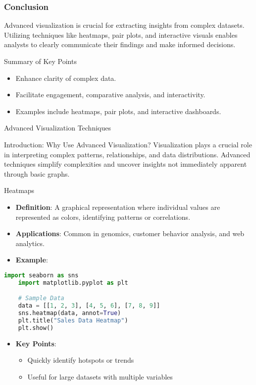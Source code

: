 \documentclass[aspectratio=169]{beamer}
\begin{document}
\begin{frame}[fragile]
    \frametitle{Conclusion}
    Advanced visualization is crucial for extracting insights from complex datasets. Utilizing techniques like heatmaps, pair plots, and interactive visuals enables analysts to clearly communicate their findings and make informed decisions. 

    \begin{block}{Summary of Key Points}
        \begin{itemize}
            \item Enhance clarity of complex data.
            \item Facilitate engagement, comparative analysis, and interactivity.
            \item Examples include heatmaps, pair plots, and interactive dashboards.
        \end{itemize}
    \end{block}
\end{frame}

\begin{frame}{Advanced Visualization Techniques}
    \begin{block}{Introduction: Why Use Advanced Visualization?}
        Visualization plays a crucial role in interpreting complex patterns, relationships, and data distributions. Advanced techniques simplify complexities and uncover insights not immediately apparent through basic graphs.
    \end{block}
\end{frame}

\begin{frame}[fragile]{Heatmaps}
    \begin{itemize}
        \item \textbf{Definition}: A graphical representation where individual values are represented as colors, identifying patterns or correlations.
        \item \textbf{Applications}: Common in genomics, customer behavior analysis, and web analytics.
        \item \textbf{Example}: 
    \end{itemize}

    \begin{lstlisting}[language=Python]
    import seaborn as sns
    import matplotlib.pyplot as plt

    # Sample Data
    data = [[1, 2, 3], [4, 5, 6], [7, 8, 9]]
    sns.heatmap(data, annot=True)
    plt.title("Sales Data Heatmap")
    plt.show()
    \end{lstlisting}

    \begin{itemize}
        \item \textbf{Key Points}:
        \begin{itemize}
            \item Quickly identify hotspots or trends
            \item Useful for large datasets with multiple variables
        \end{itemize}
    \end{itemize}
\end{frame}
\end{document}
